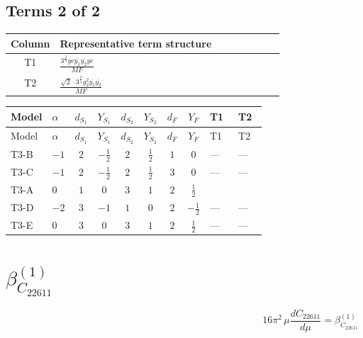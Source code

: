 \documentclass[8pt]{article}
\begin{document}
\begin{landscape}
\subsection*{Terms 2 of 2}
\begin{center}
\begin{tabular}{@{}c >{\raggedright\arraybackslash}p{0.82\linewidth}@{}}
\toprule
Column & Representative term structure \\
\midrule
T1 & \(\displaystyle \frac{3^{\frac{3}{4}} ye \overline{y_{1}} \overline{y_{2}} \overline{ye}}{MF}\) \\
\midrule
T2 & \(\displaystyle \frac{\sqrt{2} \cdot 3^{\frac{3}{4}} g_{2}^{2} \overline{y_{1}} \overline{y_{2}}}{MF}\) \\
\midrule
\bottomrule
\end{tabular}
\end{center}
\smallskip
\tiny
\begin{longtable}{@{}llcccccc >{\raggedright\arraybackslash}p{0.21\linewidth} >{\raggedright\arraybackslash}p{0.21\linewidth}@{}}
\toprule
Model & $\alpha$ & $d_{S_1}$ & $Y_{S_1}$ & $d_{S_2}$ & $Y_{S_2}$ & $d_F$ & $Y_F$ & T1 & T2 \\
\midrule
\endfirsthead
\toprule
Model & $\alpha$ & $d_{S_1}$ & $Y_{S_1}$ & $d_{S_2}$ & $Y_{S_2}$ & $d_F$ & $Y_F$ & T1 & T2 \\
\midrule
\endhead
T3-B & $-1$ & $2$ & $-\frac{1}{2}$ & $2$ & $\frac{1}{2}$ & $1$ & $0$ & --- & --- \\
\midrule
T3-C & $-1$ & $2$ & $-\frac{1}{2}$ & $2$ & $\frac{1}{2}$ & $3$ & $0$ & --- & --- \\
\midrule
T3-A & $0$ & $1$ & $0$ & $3$ & $1$ & $2$ & $\frac{1}{2}$ & \scriptsize\adjustbox{max width=\linewidth}{$\begin{gathered} - \frac{3^{\frac{3}{4}} ye \overline{y_{1}} \overline{y_{2}} \overline{ye}}{12 MF}\end{gathered}$} & \scriptsize\adjustbox{max width=\linewidth}{$\begin{gathered} \frac{\sqrt{2} \cdot 3^{\frac{3}{4}} g_{2}^{2} \overline{y_{1}} \overline{y_{2}}}{3 MF}\end{gathered}$} \\
\midrule
T3-D & $-2$ & $3$ & $-1$ & $1$ & $0$ & $2$ & $-\frac{1}{2}$ & --- & --- \\
\midrule
T3-E & $0$ & $3$ & $0$ & $3$ & $1$ & $2$ & $\frac{1}{2}$ & --- & --- \\
\midrule
\bottomrule
\end{longtable}
\clearpage
\section*{$\beta_{C_{22611}}^{(1)}$}
\[16\pi^2\,\mu\frac{d C_{22611}}{d\mu}=\beta_{C_{22611}}^{(1)}\]

\end{landscape}
\end{document}
